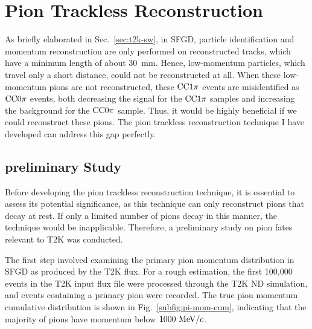     \section{Pion Trackless Reconstruction}
       \label{sec:sel-tl}
          As briefly elaborated in Sec.~\ref{sec:t2k-sw}, in SFGD, particle identification and momentum reconstruction are only performed on reconstructed tracks, which have a minimum length of about $30$~mm. 
          Hence, low-momentum particles, which travel only a short distance, could not be reconstructed at all. 
          When these low-momentum pions are not reconstructed, these $\textrm{CC}1\pi$ events are misidentified as $\textrm{CC}0\pi$ events, both decreasing the signal for the $\textrm{CC}1\pi$ samples and increasing the background for the $\textrm{CC}0\pi$ sample. 
          Thus, it would be highly beneficial if we could reconstruct these pions. 
          The pion trackless reconstruction technique I have developed can address this gap perfectly.

     
       \subsection{preliminary Study}
       \label{sec:tl-ps}
          Before developing the pion trackless reconstruction technique, it is essential to assess its potential significance, as this technique can only reconstruct pions that decay at rest. 
          If only a limited number of pions decay in this manner, the technique would be inapplicable. 
          Therefore, a preliminary study on pion fates relevant to T2K was conducted.

          The first step involved examining the primary pion momentum distribution in SFGD as produced by the T2K flux. 
          For a rough estimation, the first 100,000 events in the T2K input flux file were processed through the T2K ND simulation, and events containing a primary pion were recorded. 
          The true pion momentum cumulative distribution is shown in Fig.~\ref{subfig:pi-mom-cum}, indicating that the majority of pions have momentum below $1000~\textrm{MeV}/c$.

